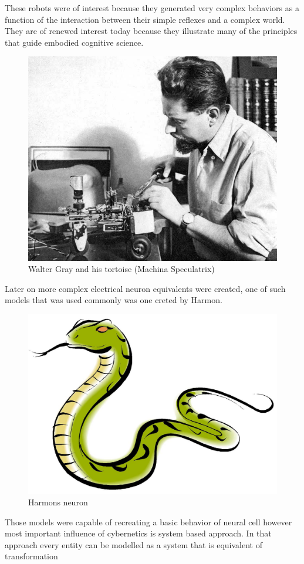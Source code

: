 These robots were of interest because they generated very complex behaviors as a 
function of the interaction between their simple reflexes and a complex world.
They are of renewed interest today because they illustrate many of the principles 
that guide embodied cognitive science. 
\begin{figure}[ht]
	\includegraphics[width=\textwidth]{res/grey_turtle}
	\caption{Walter Gray and his tortoise (Machina Speculatrix)}
	\label{fig:grey_turtle}
\end{figure}
Later on more complex electrical neuron equivalents were created, one of such models that
was used commonly was one creted by Harmon.
\begin{figure}[ht]
	\includegraphics[width=\textwidth]{res/snek}
	\caption{Harmons neuron}
	\label{fig:harmon}
\end{figure}
Those models were capable of recreating a basic behavior of neural cell however most important
influence of cybernetics is system based approach.
In that approach every entity can be modelled as a system that is equivalent of transformation

